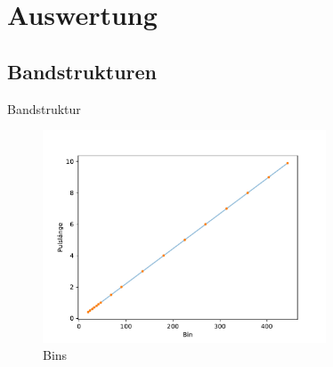 \section{Auswertung}
\label{sec:Auswertung}
\subsection{Bandstrukturen}
Bandstruktur
\begin{figure}
    \centering
    \includegraphics[width = 0.75\textwidth]{./plots/bins.pdf}
    \caption{Bins}
    \label{fig:bins}
\end{figure}